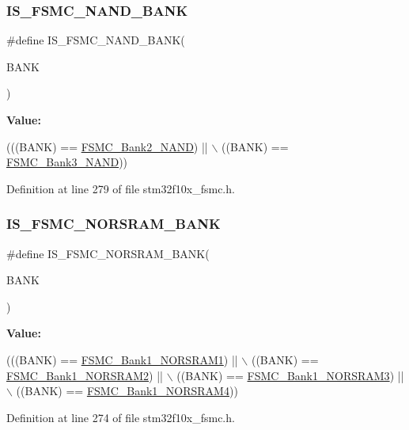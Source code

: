 \subsubsection{\texorpdfstring{I\+S\+\_\+\+F\+S\+M\+C\+\_\+\+N\+A\+N\+D\+\_\+\+B\+A\+NK}{IS\_FSMC\_NAND\_BANK}}
{\footnotesize\ttfamily \#define I\+S\+\_\+\+F\+S\+M\+C\+\_\+\+N\+A\+N\+D\+\_\+\+B\+A\+NK(\begin{DoxyParamCaption}\item[{}]{B\+A\+NK }\end{DoxyParamCaption})}

{\bfseries Value\+:}
\begin{DoxyCode}
(((BANK) == \hyperlink{group___f_s_m_c___n_a_n_d___bank_ga294e7134aa329a09e56b61eec9882a27}{FSMC\_Bank2\_NAND}) || \(\backslash\)
                                 ((BANK) == \hyperlink{group___f_s_m_c___n_a_n_d___bank_gaf72def0732c026b0245d721ee371c85b}{FSMC\_Bank3\_NAND}))
\end{DoxyCode}


Definition at line 279 of file stm32f10x\+\_\+fsmc.\+h.

\mbox{\label{group___f_s_m_c___exported___constants_ga3e3bed3dd83d38e63f11ac4cbcb87304}} 
\subsubsection{\texorpdfstring{I\+S\+\_\+\+F\+S\+M\+C\+\_\+\+N\+O\+R\+S\+R\+A\+M\+\_\+\+B\+A\+NK}{IS\_FSMC\_NORSRAM\_BANK}}
{\footnotesize\ttfamily \#define I\+S\+\_\+\+F\+S\+M\+C\+\_\+\+N\+O\+R\+S\+R\+A\+M\+\_\+\+B\+A\+NK(\begin{DoxyParamCaption}\item[{}]{B\+A\+NK }\end{DoxyParamCaption})}

{\bfseries Value\+:}
\begin{DoxyCode}
(((BANK) == \hyperlink{group___f_s_m_c___n_o_r_s_r_a_m___bank_ga514a05828041fa1a13d464c9e4a0a4a9}{FSMC\_Bank1\_NORSRAM1}) || \(\backslash\)
                                    ((BANK) == \hyperlink{group___f_s_m_c___n_o_r_s_r_a_m___bank_gaef52862c652370b9a658478d275dd956}{FSMC\_Bank1\_NORSRAM2}) || \(\backslash\)
                                    ((BANK) == \hyperlink{group___f_s_m_c___n_o_r_s_r_a_m___bank_ga151b02506a318ac77382b52f3b5e16f4}{FSMC\_Bank1\_NORSRAM3}) || \(\backslash\)
                                    ((BANK) == \hyperlink{group___f_s_m_c___n_o_r_s_r_a_m___bank_ga1083572834aa084d21e6698c280f8f74}{FSMC\_Bank1\_NORSRAM4}))
\end{DoxyCode}


Definition at line 274 of file stm32f10x\+\_\+fsmc.\+h.

